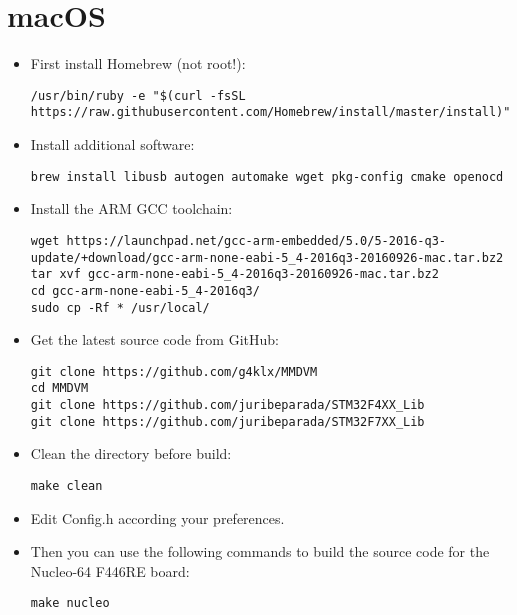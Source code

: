 \documentclass[]{article}
\begin{document}
\section{macOS}

\begin{itemize}[leftmargin=*]
	
\item First install Homebrew (not root!):
\begin{lstlisting}[style=DOS]
/usr/bin/ruby -e "$(curl -fsSL https://raw.githubusercontent.com/Homebrew/install/master/install)"
\end{lstlisting}

\item Install additional software:
\begin{lstlisting}[style=DOS]
brew install libusb autogen automake wget pkg-config cmake openocd
\end{lstlisting}

\item Install the ARM GCC toolchain:
\begin{lstlisting}[style=DOS]
wget https://launchpad.net/gcc-arm-embedded/5.0/5-2016-q3-update/+download/gcc-arm-none-eabi-5_4-2016q3-20160926-mac.tar.bz2
tar xvf gcc-arm-none-eabi-5_4-2016q3-20160926-mac.tar.bz2
cd gcc-arm-none-eabi-5_4-2016q3/
sudo cp -Rf * /usr/local/
\end{lstlisting}

\item Get the latest source code from GitHub:
\begin{lstlisting}[style=DOS]
git clone https://github.com/g4klx/MMDVM
cd MMDVM
git clone https://github.com/juribeparada/STM32F4XX_Lib
git clone https://github.com/juribeparada/STM32F7XX_Lib
\end{lstlisting}

\item Clean the directory before build:
\begin{lstlisting}[style=DOS]
make clean
\end{lstlisting}

\item Edit Config.h according your preferences.

\item Then you can use the following commands to build the source code for the Nucleo-64 F446RE board:
\begin{lstlisting}[style=DOS]
make nucleo
\end{lstlisting}


\end{itemize}
\end{document}
